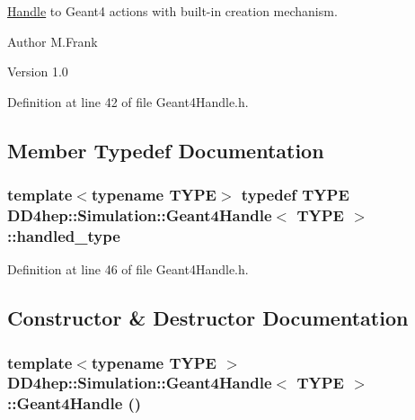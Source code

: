 \hyperlink{class_d_d4hep_1_1_handle}{Handle} to Geant4 actions with built-\/in creation mechanism. \begin{DoxyAuthor}{Author}
M.Frank 
\end{DoxyAuthor}
\begin{DoxyVersion}{Version}
1.0 
\end{DoxyVersion}


Definition at line 42 of file Geant4Handle.h.

\subsection{Member Typedef Documentation}
\hypertarget{class_d_d4hep_1_1_simulation_1_1_geant4_handle_a35e583b9228e38c95d23112ad19b645d}{
\subsubsection[{handled\_\-type}]{\setlength{\rightskip}{0pt plus 5cm}template$<$typename TYPE$>$ typedef TYPE {\bf DD4hep::Simulation::Geant4Handle}$<$ TYPE $>$::{\bf handled\_\-type}}}
\label{class_d_d4hep_1_1_simulation_1_1_geant4_handle_a35e583b9228e38c95d23112ad19b645d}


Definition at line 46 of file Geant4Handle.h.

\subsection{Constructor \& Destructor Documentation}
\hypertarget{class_d_d4hep_1_1_simulation_1_1_geant4_handle_a0c81dba8f012c42cf56aa9de145ceba7}{
\subsubsection[{Geant4Handle}]{\setlength{\rightskip}{0pt plus 5cm}template$<$typename TYPE $>$ {\bf DD4hep::Simulation::Geant4Handle}$<$ TYPE $>$::{\bf Geant4Handle} ()}}
\label{class_d_d4hep_1_1_simulation_1_1_geant4_handle_a0c81dba8f012c42cf56aa9de145ceba7}


